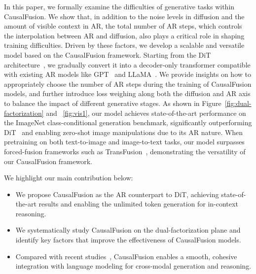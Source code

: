 In this paper, we formally examine the difficulties of generative tasks within CausalFusion. We show that, in addition to the noise levels in diffusion and the amount of visible context in AR, the total number of AR steps, which controls the interpolation between AR and diffusion, also plays a critical role in shaping training difficulties. Driven by these factors, we develop a scalable and versatile model based on the CausalFusion framework. Starting from the DiT architecture~\cite{dit}, we gradually convert it into a decoder-only transformer compatible with existing AR models like GPT~\cite{gpt1,gpt2,gpt3} and LLaMA~\cite{llama1,llama2,llama3}. We provide insights on how to appropriately choose the number of AR steps during the training of CausalFusion models, and further introduce loss weighing along both the diffusion and AR axis to balance the impact of different generative stages. As shown in Figure~\ref{fig:dual-factorization} and ~\ref{fig:vis1}, our model achieves state-of-the-art performance on the ImageNet class-conditional generation benchmark, significantly outperforming DiT~\cite{dit} and enabling zero-shot image manipulations due to its AR nature. When pretraining on both text-to-image and image-to-text tasks, our model surpasses forced-fusion frameworks such as TransFusion~\cite{transfusion}, demonstrating the versatility of our CausalFusion framework.


We highlight our main contribution below:
\begin{itemize}
\item  We propose CausalFusion as the AR counterpart to DiT, achieving state-of-the-art results and enabling the unlimited token generation for in-context reasoning.
\item  We systematically study CausalFusion on the dual-factorization plane and identify key factors that improve the effectiveness of CausalFusion models.
\item  Compared with recent studies~\cite{transfusion}, CausalFusion enables a smooth, cohesive integration with language modeling for cross-modal generation and reasoning.
\end{itemize} 
